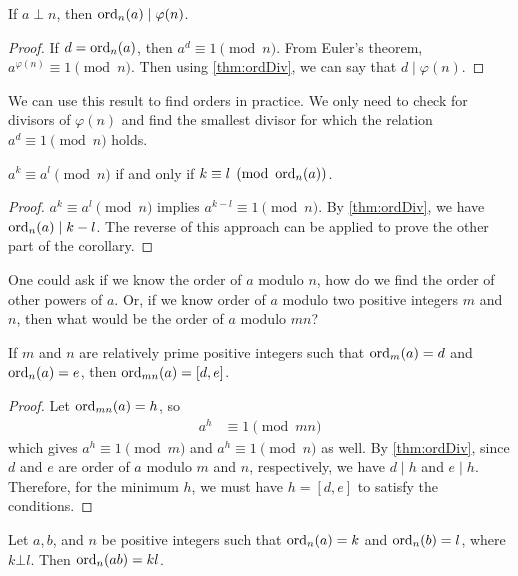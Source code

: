 \begin{corollary}\label{cor:phiDiv}
	If $a\perp n$, then $\operatorname{ord}_n(a)\mid \varphi (n)$.
\end{corollary}

\begin{proof}
	If $d=\operatorname{ord}_n(a)$, then $a^d\equiv1\pmod n$. From Euler's theorem, $a^{\varphi (n)}\equiv1\pmod n$. Then using \autoref{thm:ordDiv}, we can say that $d\mid \varphi (n)$.
\end{proof}
We can use this result to find orders in practice. We only need to check for divisors of $\varphi(n)$ and find the smallest divisor for which the relation $a^d\equiv1\pmod n$ holds.
\begin{corollary}
	$a^k\equiv a^l\pmod n$ if and only if $k\equiv l\pmod{\operatorname{ord}_n(a)}$.
\end{corollary}

\begin{proof}
	$a^k\equiv a^l\pmod n$ implies $a^{k-l} \equiv 1 \pmod n$. By \autoref{thm:ordDiv}, we have $\operatorname{ord}_n(a) \mid  k-l$. The reverse of this approach can be applied to prove the other part of the corollary.
\end{proof}
One could ask if we know the order of $a$ modulo $n$, how do we find the order of other powers of $a$. Or, if we know order of $a$ modulo two positive integers $m$ and $n$, then what would be the order of $a$ modulo $mn$?
\begin{theorem}
	If $m$ and $n$ are relatively prime positive integers such that $\operatorname{ord}_m(a)=d$ and $\operatorname{ord}_n(a)=e$, then $\operatorname{ord}_{mn}(a)=[d,e]$.\label{thm:ordL}
\end{theorem}

\begin{proof}
	Let $\operatorname{ord}_{mn}(a)=h$, so
		\begin{align*}
			a^h
				& \equiv1\pmod {mn}
		\end{align*}
	which gives $a^h\equiv1\pmod m$ and $a^h\equiv1\pmod n$ as well. By \autoref{thm:ordDiv}, since $d$ and $e$ are order of $a$ modulo $m$ and $n$, respectively, we have $d\mid h$ and $e\mid h$. Therefore, for the minimum $h$, we must have $h=[d,e]$ to satisfy the conditions.
\end{proof}

\begin{theorem}\label{thm:prproduct}
	Let $a,b$, and $n$ be positive integers such that $\operatorname{ord}_n(a)=k$ and $\operatorname{ord}_n(b)=l$, where $k\bot l$. Then $\operatorname{ord}_n(ab)=kl$.
\end{theorem}


